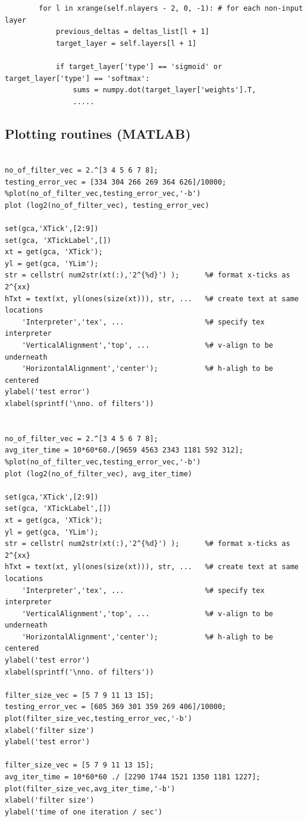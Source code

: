 \documentclass[10pt,twocolumn]{article}
\begin{document}
\begin{lstlisting}
		for l in xrange(self.nlayers - 2, 0, -1): # for each non-input layer
			previous_deltas = deltas_list[l + 1]
			target_layer = self.layers[l + 1]

			if target_layer['type'] == 'sigmoid' or target_layer['type'] == 'softmax':
				sums = numpy.dot(target_layer['weights'].T,
				.....

\end{lstlisting}

\subsection{Plotting routines (MATLAB)}
\begin{lstlisting}

no_of_filter_vec = 2.^[3 4 5 6 7 8];
testing_error_vec = [334 304 266 269 364 626]/10000;
%plot(no_of_filter_vec,testing_error_vec,'-b')
plot (log2(no_of_filter_vec), testing_error_vec)

set(gca,'XTick',[2:9])
set(gca, 'XTickLabel',[])
xt = get(gca, 'XTick');
yl = get(gca, 'YLim');
str = cellstr( num2str(xt(:),'2^{%d}') );      %# format x-ticks as 2^{xx}
hTxt = text(xt, yl(ones(size(xt))), str, ...   %# create text at same locations
    'Interpreter','tex', ...                   %# specify tex interpreter
    'VerticalAlignment','top', ...             %# v-align to be underneath
    'HorizontalAlignment','center');           %# h-aligh to be centered
ylabel('test error')
xlabel(sprintf('\nno. of filters'))


no_of_filter_vec = 2.^[3 4 5 6 7 8];
avg_iter_time = 10*60*60./[9659 4563 2343 1181 592 312];
%plot(no_of_filter_vec,testing_error_vec,'-b')
plot (log2(no_of_filter_vec), avg_iter_time)

set(gca,'XTick',[2:9])
set(gca, 'XTickLabel',[])
xt = get(gca, 'XTick');
yl = get(gca, 'YLim');
str = cellstr( num2str(xt(:),'2^{%d}') );      %# format x-ticks as 2^{xx}
hTxt = text(xt, yl(ones(size(xt))), str, ...   %# create text at same locations
    'Interpreter','tex', ...                   %# specify tex interpreter
    'VerticalAlignment','top', ...             %# v-align to be underneath
    'HorizontalAlignment','center');           %# h-aligh to be centered
ylabel('test error')
xlabel(sprintf('\nno. of filters'))

filter_size_vec = [5 7 9 11 13 15];
testing_error_vec = [605 369 301 359 269 406]/10000;
plot(filter_size_vec,testing_error_vec,'-b')
xlabel('filter size')
ylabel('test error')

filter_size_vec = [5 7 9 11 13 15];
avg_iter_time = 10*60*60 ./ [2290 1744 1521 1350 1181 1227];
plot(filter_size_vec,avg_iter_time,'-b')
xlabel('filter size')
ylabel('time of one iteration / sec')

\end{lstlisting}

{}

\end{document}
